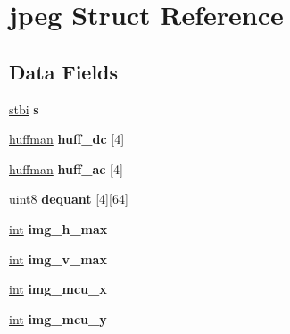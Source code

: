 \hypertarget{structjpeg}{}\section{jpeg Struct Reference}
\label{structjpeg}
\subsection*{Data Fields}
\begin{DoxyCompactItemize}
\item 
\hyperlink{structstbi}{stbi} {\bfseries s}\hypertarget{structjpeg_a7dfd23d966072a9898748c419db6d288}{}\label{structjpeg_a7dfd23d966072a9898748c419db6d288}

\item 
\hyperlink{structhuffman}{huffman} {\bfseries huff\+\_\+dc} \mbox{[}4\mbox{]}\hypertarget{structjpeg_a0e4b65be67f4acccfde0a825a1fcb5d2}{}\label{structjpeg_a0e4b65be67f4acccfde0a825a1fcb5d2}

\item 
\hyperlink{structhuffman}{huffman} {\bfseries huff\+\_\+ac} \mbox{[}4\mbox{]}\hypertarget{structjpeg_a33d36e260ae3185e30371b1b805ea542}{}\label{structjpeg_a33d36e260ae3185e30371b1b805ea542}

\item 
uint8 {\bfseries dequant} \mbox{[}4\mbox{]}\mbox{[}64\mbox{]}\hypertarget{structjpeg_aac345c283e7b1da620731a43d9b8e189}{}\label{structjpeg_aac345c283e7b1da620731a43d9b8e189}

\item 
\hyperlink{_s_d_l__thread_8h_a6a64f9be4433e4de6e2f2f548cf3c08e}{int} {\bfseries img\+\_\+h\+\_\+max}\hypertarget{structjpeg_acfc6a655a1bfbd1ed49d61bf31304423}{}\label{structjpeg_acfc6a655a1bfbd1ed49d61bf31304423}

\item 
\hyperlink{_s_d_l__thread_8h_a6a64f9be4433e4de6e2f2f548cf3c08e}{int} {\bfseries img\+\_\+v\+\_\+max}\hypertarget{structjpeg_a80aa99964a0dc051af0396e9811e4e63}{}\label{structjpeg_a80aa99964a0dc051af0396e9811e4e63}

\item 
\hyperlink{_s_d_l__thread_8h_a6a64f9be4433e4de6e2f2f548cf3c08e}{int} {\bfseries img\+\_\+mcu\+\_\+x}\hypertarget{structjpeg_a29fcc3c8789a1d688501c6c89fca82c7}{}\label{structjpeg_a29fcc3c8789a1d688501c6c89fca82c7}

\item 
\hyperlink{_s_d_l__thread_8h_a6a64f9be4433e4de6e2f2f548cf3c08e}{int} {\bfseries img\+\_\+mcu\+\_\+y}\hypertarget{structjpeg_a18b1593ec8e6661fa1e537f49b07d68a}{}\label{structjpeg_a18b1593ec8e6661fa1e537f49b07d68a}


\end{DoxyCompactItemize}
